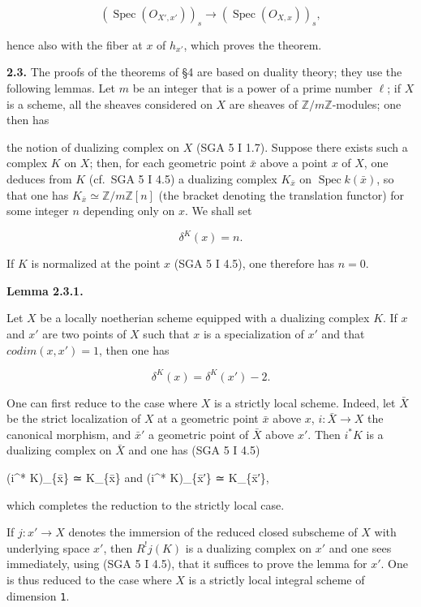 \documentclass[
]{article}
\newenvironment{Shaded}{}{}
\newcommand{\NormalTok}[1]{#1}
\begin{document}
\[
(\operatorname{Spec}(O_{X',x'}))_{s} \to (\operatorname{Spec}(O_{X,x}))_{s},
\]

hence also with the fiber at \(x\) of \(h_{x'}\), which proves the
theorem.

\textbf{2.3.} The proofs of the theorems of §4 are based on duality
theory; they use the following lemmas. Let \(m\) be an integer that is a
power of a prime number \(\ell\); if \(X\) is a scheme, all the sheaves
considered on \(X\) are sheaves of \(\mathbb{Z}/m\mathbb{Z}\)-modules;
one then has

the notion of dualizing complex on \(X\) (SGA 5 I 1.7). Suppose there
exists such a complex \(K\) on \(X\); then, for each geometric point
\(\bar{x}\) above a point \(x\) of \(X\), one deduces from \(K\)
(cf.~SGA 5 I 4.5) a dualizing complex \(K_{\bar{x}}\) on
\(\operatorname{Spec} k(\bar{x})\), so that one has
\(K_{\bar{x}} \simeq \mathbb{Z}/m\mathbb{Z}[n]\) (the bracket denoting
the translation functor) for some integer \(n\) depending only on \(x\).
We shall set

\[
\delta^{K}(x) = n.
\]

If \(K\) is normalized at the point \(x\) (SGA 5 I 4.5), one therefore
has \(n = 0\).

\textbf{Lemma 2.3.1.}

Let \(X\) be a locally noetherian scheme equipped with a dualizing
complex \(K\). If \(x\) and \(x'\) are two points of \(X\) such that
\(x\) is a specialization of \(x'\) and that \(codim({x}, {x'}) = 1\),
then one has

\[
\delta^{K}(x) = \delta^{K}(x') - 2.
\]

One can first reduce to the case where \(X\) is a strictly local scheme.
Indeed, let \(\bar{X}\) be the strict localization of \(X\) at a
geometric point \(\bar{x}\) above \(x\), \(i : \bar{X} \to X\) the
canonical morphism, and \(\bar{x}'\) a geometric point of \(\bar{X}\)
above \(x'\). Then \(i^{*} K\) is a dualizing complex on \(\bar{X}\) and
one has (SGA 5 I 4.5)

\begin{Shaded}
\begin{Highlighting}[]
\NormalTok{(i\^{}* K)\_\{x̄\} ≃ K\_\{x̄\} and (i\^{}* K)\_\{x̄′\} ≃ K\_\{x̄′\},}
\end{Highlighting}
\end{Shaded}

which completes the reduction to the strictly local case.

If \(j : {x'} \to X\) denotes the immersion of the reduced closed
subscheme of \(X\) with underlying space \({x'}\), then \(R^{!} j(K)\)
is a dualizing complex on \({x'}\) and one sees immediately, using (SGA
5 I 4.5), that it suffices to prove the lemma for \({x'}\). One is thus
reduced to the case where \(X\) is a strictly local integral scheme of
dimension \texttt{1}.
\end{document}
